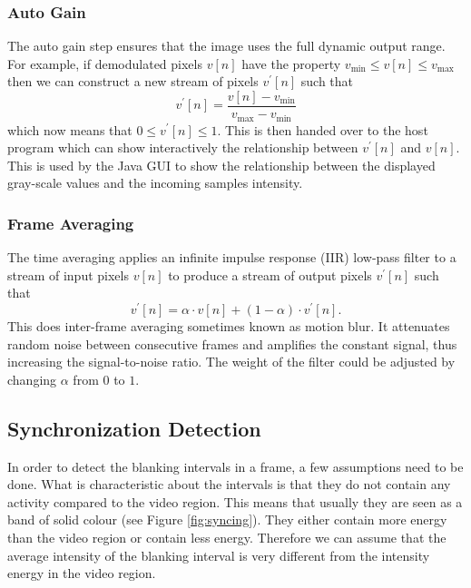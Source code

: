 \documentclass[a4paper,12pt,twoside,openright]{report}
\begin{document}
\subsubsection{Auto Gain}

The auto gain step ensures that the image uses the full dynamic output range. For example, if demodulated pixels $v[n]$ have the property $v_\text{min} \leq v[n] \leq v_\text{max}$ then we can construct a new stream of pixels $v^{\prime}[n]$ such that
$$v^{\prime}[n] = \frac{v[n] - v_\text{min}}{v_\text{max} - v_\text{min}}$$
which now means that $0 \leq v^{\prime}[n] \leq 1$. This is then handed over to the host program which can show interactively the relationship between $v^{\prime}[n]$ and $v[n]$. This is used by the Java GUI to show the relationship between the displayed gray-scale values and the incoming samples intensity.

\subsubsection{Frame Averaging}

The time averaging applies an infinite impulse response (IIR) low-pass filter to a stream of input pixels $v[n]$ to produce a stream of output pixels $v^{\prime}[n]$ such that
$$v^{\prime}[n] =  \alpha \cdot v[n] + (1 - \alpha) \cdot v^{\prime}[n].$$
This does inter-frame averaging sometimes known as motion blur. It attenuates random noise between consecutive frames and amplifies the constant signal, thus increasing the signal-to-noise ratio. The weight of the filter could be adjusted by changing $\alpha$ from $0$ to $1$.

\subsection{Synchronization Detection}

In order to detect the blanking intervals in a frame, a few assumptions need to be done. What is characteristic about the intervals is that they do not contain any activity compared to the video region. This means that usually they are seen as a band of solid colour (see Figure \ref{fig:syncing}). They either contain more energy than the video region or contain less energy. Therefore we can assume that the average intensity of the blanking interval is very different from the intensity energy in the video region.
\end{document}
